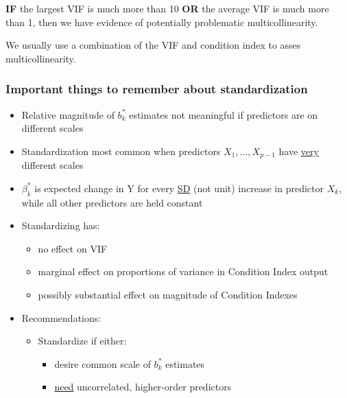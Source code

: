\documentclass[12pt]{../notes}
\begin{document}
\nspace
\textbf{IF} the largest VIF is much more than 10 \textbf{OR} the average VIF is much more than 1, then we have evidence of potentially problematic multicollinearity. 


We usually use a combination of the VIF and condition index to asses multicollinearity.

\subsubsection{Important things to remember about standardization}
    \begin{itemize}
        \item Relative magnitude of $b^*_k$ estimates not meaningful if predictors are on different scales
        \item Standardization most common when predictors $X_1, \ldots, X_{p-1}$ have \underline{very} different scales
        \item $\beta^*_k$ is expected change in Y for every \underline{SD} (not unit) increase in predictor $X_k$,
while all other predictors are held constant
  \item Standardizing has:
      \begin{itemize}
          \item no effect on VIF
          \item marginal effect on proportions of variance in Condition Index output
          \item possibly substantial effect on magnitude of Condition Indexes
      \end{itemize}
  \item Recommendations:
     \begin{itemize}
        \item Standardize if either:
          \begin{itemize}
            \item desire common scale of $b^*_k$ estimates\\ \vspace{1em} %
            \item \underline{need} uncorrelated, higher-order predictors\\ \vspace{1em} %
          \end{itemize}
     \end{itemize}
     \end{itemize}
\end{document}
